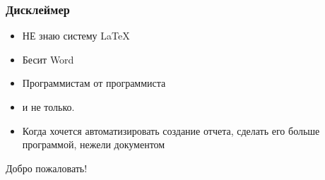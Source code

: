 \begin{frame}
	\frametitle{Дисклеймер}
	\begin{itemize}
		\item НЕ знаю систему \LaTeX
		\pause
		\item Бесит Word
		\pause
		\item Программистам от программиста
		\pause
		\item и не только.
		\pause
		\item Когда хочется автоматизировать создание отчета, сделать его больше программой, нежели документом   
	\end{itemize}
	\pause
	
	\vspace{1cm}
	\begin{center}
	  \color{red} Добро пожаловать!
	\end{center}
	
\end{frame}

